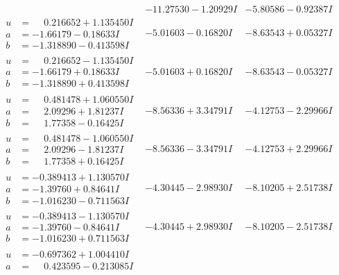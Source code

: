 \documentclass[1p]{elsarticle_modified}
\theoremstyle{definition}
\begin{document}
$$\begin{array}{c|c|c}
 & -11.27530 - 1.20929 I & -5.80586 - 0.92387 I \\ \hline\begin{aligned}
u &= \phantom{-}0.216652 + 1.135450 I \\
a &= -1.66179 - 0.18633 I \\
b &= -1.318890 - 0.413598 I\end{aligned}
 & -5.01603 - 0.16820 I & -8.63543 + 0.05327 I \\ \hline\begin{aligned}
u &= \phantom{-}0.216652 - 1.135450 I \\
a &= -1.66179 + 0.18633 I \\
b &= -1.318890 + 0.413598 I\end{aligned}
 & -5.01603 + 0.16820 I & -8.63543 - 0.05327 I \\ \hline\begin{aligned}
u &= \phantom{-}0.481478 + 1.060550 I \\
a &= \phantom{-}2.09296 + 1.81237 I \\
b &= \phantom{-}1.77358 - 0.16425 I\end{aligned}
 & -8.56336 + 3.34791 I & -4.12753 - 2.29966 I \\ \hline\begin{aligned}
u &= \phantom{-}0.481478 - 1.060550 I \\
a &= \phantom{-}2.09296 - 1.81237 I \\
b &= \phantom{-}1.77358 + 0.16425 I\end{aligned}
 & -8.56336 - 3.34791 I & -4.12753 + 2.29966 I \\ \hline\begin{aligned}
u &= -0.389413 + 1.130570 I \\
a &= -1.39760 + 0.84641 I \\
b &= -1.016230 - 0.711563 I\end{aligned}
 & -4.30445 - 2.98930 I & -8.10205 + 2.51738 I \\ \hline\begin{aligned}
u &= -0.389413 - 1.130570 I \\
a &= -1.39760 - 0.84641 I \\
b &= -1.016230 + 0.711563 I\end{aligned}
 & -4.30445 + 2.98930 I & -8.10205 - 2.51738 I \\ \hline\begin{aligned}
u &= -0.697362 + 1.004410 I \\
a &= \phantom{-}0.423595 - 0.213085 I \\

\end{aligned}
\end{array}$$
\end{document}
